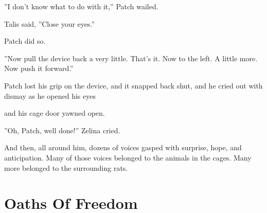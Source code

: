 \documentclass[12pt]{book}
\begin{document}
''I don't know what to do with it,'' Patch wailed.\par
Talis said, ''Close your eyes.''\par
Patch did so.\par
''Now pull the device back a very little. That's it. Now to the left. A little more. Now push it forward.''\par
Patch lost his grip on the device, and it snapped back shut, and he cried out with dismay as he opened his eyes %
\par
 and his cage door yawned open.\par
''Oh, Patch, well done!'' Zelina cried.\par
And then, all around him, dozens of voices gasped with surprise, hope, and anticipation. Many of those voices belonged to the animals in the cages. Many more belonged to the surrounding rats.\par

\section{Oaths Of Freedom}
\end{document}
